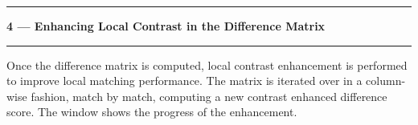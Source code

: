 \noindent\rule{\textwidth}{1pt}
\indent \textbf{4 --- Enhancing Local Contrast in the Difference Matrix}
\noindent\rule{\textwidth}{1pt}
\smallskip
\parbox{\textwidth}{Once the difference matrix is computed, local contrast enhancement is performed to improve local matching performance. The matrix is iterated over in a column-wise fashion, match by match, computing a new contrast enhanced difference score. The window shows the progress of the enhancement.}
\smallskip
